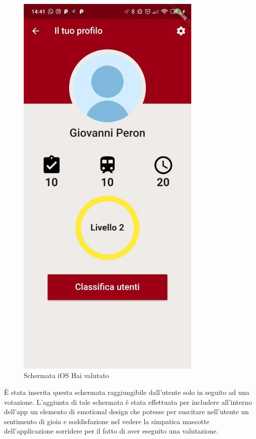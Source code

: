 \begin{minipage}{0.45\textwidth}
	\begin{figure}[H]
		\centering
		\includegraphics[width=0.8\textwidth]{immagini/profile.jpg}
		\caption{Schermata iOS Hai valutato}
	\end{figure}
\end{minipage}
È stata inserita questa schermata raggiungibile dall'utente solo in seguito ad una votazione. L'aggiunta di tale schermata è stata effettuata per includere all'interno dell'app un elemento di emotional design che potesse per suscitare nell'utente un sentimento di gioia e soddisfazione nel vedere la simpatica mascotte dell'applicazione sorridere per il fatto di aver eseguito una valutazione.
